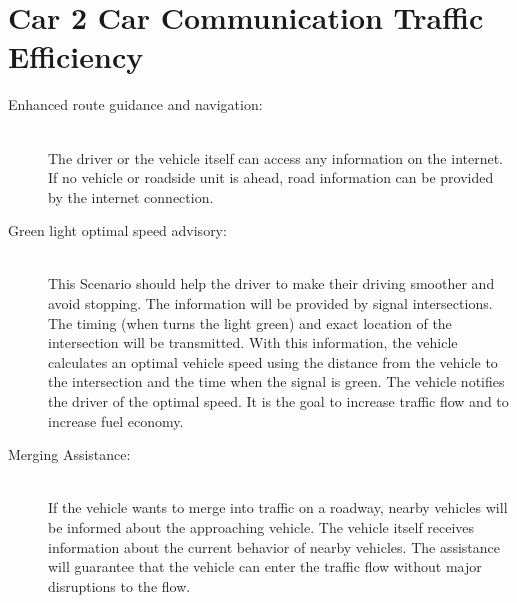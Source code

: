 \section{Car 2 Car Communication Traffic Efficiency}
\label{sec:C2CTarfficEfficiency}
\begin{description}
  \item[Enhanced route guidance and navigation:] \hfill \\ The driver or the vehicle itself can access any information on the internet. If no vehicle or roadside unit is ahead, road information can be provided by the internet connection.
  \item[Green light optimal speed advisory:] \hfill \\ This Scenario should help the driver to make their driving smoother and avoid stopping. The information will be provided by signal intersections. The timing (when turns the light green) and exact location of the intersection will be transmitted. With this information, the vehicle calculates an optimal vehicle speed using the distance from the vehicle to the intersection and the time when the signal is green. The vehicle notifies the driver of the optimal speed. It is the goal to increase traffic flow and to increase fuel economy. 
  \item[Merging Assistance:] \hfill \\ If the vehicle wants to merge into traffic on a roadway, nearby vehicles will be informed about the approaching vehicle. The vehicle itself receives information about the current behavior of nearby vehicles. The assistance will guarantee that the vehicle can enter the traffic flow without major disruptions to the flow. 
\end{description}	

